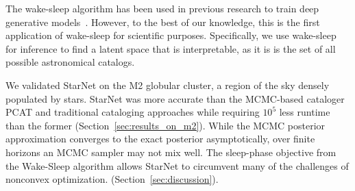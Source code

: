 The wake-sleep algorithm has been used in previous research to train deep generative models~\cite{Hinton1995wake_sleep, bornschein2014reweighted, le2020revisiting}.
However, to the best of our knowledge, this is the first application of wake-sleep for scientific purposes. 
Specifically, we use wake-sleep for inference to find a latent space that is interpretable, as it is is the set of all possible astronomical catalogs.

We validated StarNet on the M2 globular cluster, a region of the sky densely populated by stars. StarNet was more accurate than the MCMC-based cataloger PCAT and traditional cataloging approaches while requiring $10^5$ less runtime than the former (Section~\ref{sec:results_on_m2}).
While the MCMC posterior approximation converges to the exact posterior asymptotically, over finite horizons an MCMC sampler may not mix well. The sleep-phase objective from the Wake-Sleep algorithm allows StarNet to circumvent many of the challenges of nonconvex optimization.
(Section~\ref{sec:discussion}).



















